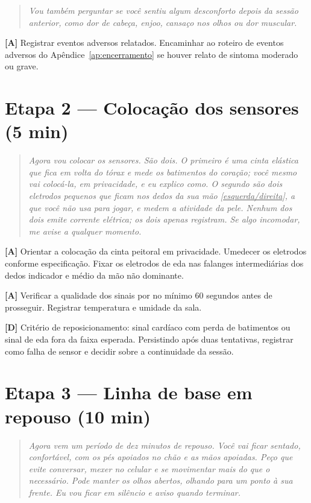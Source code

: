 \begin{quote}\itshape
Vou também perguntar se você sentiu algum desconforto depois da sessão anterior, como dor de cabeça, enjoo, cansaço nos olhos ou dor muscular.
\end{quote}

\noindent\textbf{[A]} Registrar eventos adversos relatados. Encaminhar ao roteiro de eventos adversos do Apêndice~\ref{ap:encerramento} se houver relato de sintoma moderado ou grave.

\section*{Etapa 2 --- Colocação dos sensores (5 min)}

\begin{quote}\itshape
Agora vou colocar os sensores. São dois. O primeiro é uma cinta elástica que fica em volta do tórax e mede os batimentos do coração; você mesmo vai colocá-la, em privacidade, e eu explico como. O segundo são dois eletrodos pequenos que ficam nos dedos da sua mão [\underline{esquerda/direita}], a que você não usa para jogar, e medem a atividade da pele. Nenhum dos dois emite corrente elétrica; os dois apenas registram. Se algo incomodar, me avise a qualquer momento.
\end{quote}

\noindent\textbf{[A]} Orientar a colocação da cinta peitoral em privacidade. Umedecer os eletrodos conforme especificação. Fixar os eletrodos de \gls{eda} nas falanges intermediárias dos dedos indicador e médio da mão não dominante.

\noindent\textbf{[A]} Verificar a qualidade dos sinais por no mínimo 60 segundos antes de prosseguir. Registrar temperatura e umidade da sala.

\noindent\textbf{[D]} Critério de reposicionamento: sinal cardíaco com perda de batimentos ou sinal de \gls{eda} fora da faixa esperada. Persistindo após duas tentativas, registrar como falha de sensor e decidir sobre a continuidade da sessão.

\section*{Etapa 3 --- Linha de base em repouso (10 min)}

\begin{quote}\itshape
Agora vem um período de dez minutos de repouso. Você vai ficar sentado, confortável, com os pés apoiados no chão e as mãos apoiadas. Peço que evite conversar, mexer no celular e se movimentar mais do que o necessário. Pode manter os olhos abertos, olhando para um ponto à sua frente. Eu vou ficar em silêncio e aviso quando terminar.
\end{quote}

